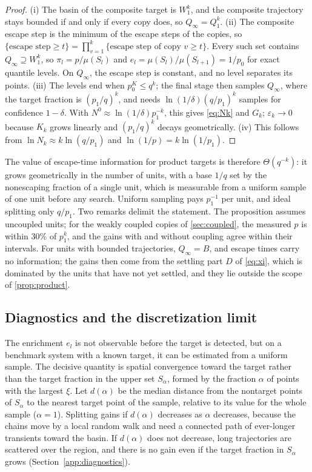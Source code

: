 \begin{proof}
(i) The basin of the composite target is $W_1^k$, and the composite trajectory stays bounded if and only if every copy does, so $Q_\infty=Q_1^k$. (ii) The composite escape step is the minimum of the escape steps of the copies, so $\{\text{escape step}\ge t\}=\prod_{v=1}^k\{\text{escape step of copy } v\ge t\}$. Every such set contains $Q_\infty\supseteq W_1^k$, so $\pi_l=p/\mu(S_l)$ and $e_l=\mu(S_l)/\mu(S_{l+1})=1/p_0$ for exact quantile levels. On $Q_\infty$, the escape step is constant, and no level separates its points. (iii) The levels end when $p_0^{K}\le q^k$; the final stage then samples $Q_\infty$, where the target fraction is $(p_1/q)^k$, and needs $\ln(1/\delta)(q/p_1)^k$ samples for confidence $1-\delta$. With $N^0\approx\ln(1/\delta)p_1^{-k}$, this gives \eqref{eq:Nk} and $G_k$; $\varepsilon_k\to0$ because $K_k$ grows linearly and $(p_1/q)^k$ decays geometrically. (iv) This follows from $\ln N_k\approx k\ln(q/p_1)$ and $\ln(1/p)=k\ln(1/p_1)$.
\end{proof}

The value of escape-time information for product targets is therefore $\Theta(q^{-k})$: it grows geometrically in the number of units, with a base $1/q$ set by the nonescaping fraction of a single unit, which is measurable from a uniform sample of one unit before any search. Uniform sampling pays $p_1^{-1}$ per unit, and ideal splitting only $q/p_1$. Two remarks delimit the statement. The proposition assumes uncoupled units; for the weakly coupled copies of \cref{sec:coupled}, the measured $p$ is within 30\% of $p_1^k$, and the gains with and without coupling agree within their intervals. For units with bounded trajectories, $Q_\infty=B$, and escape times carry no information; the gains then come from the settling part $D$ of \eqref{eq:xi}, which is dominated by the units that have not yet settled, and they lie outside the scope of \cref{prop:product}.

\subsection{Diagnostics and the discretization limit}\label{sec:diagnostics}

The enrichment $e_l$ is not observable before the target is detected, but on a benchmark system with a known target, it can be estimated from a uniform sample. The decisive quantity is spatial convergence toward the target rather than the target fraction in the upper set $S_\alpha$, formed by the fraction $\alpha$ of points with the largest $\xi$. Let $d(\alpha)$ be the median distance from the nontarget points of $S_\alpha$ to the nearest target point of the sample, relative to its value for the whole sample ($\alpha=1$). Splitting gains if $d(\alpha)$ decreases as $\alpha$ decreases, because the chains move by a local random walk and need a connected path of ever-longer transients toward the basin. If $d(\alpha)$ does not decrease, long trajectories are scattered over the region, and there is no gain even if the target fraction in $S_\alpha$ grows (Section~\ref{app:diagnostics}).

